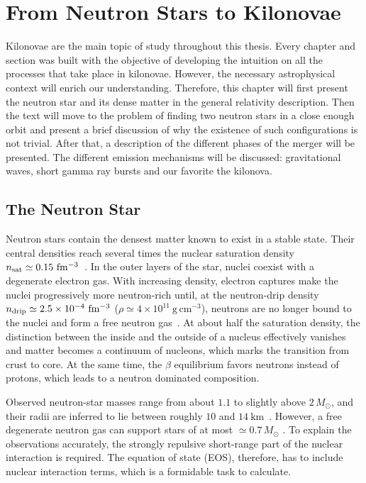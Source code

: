 \chapter{From Neutron Stars to Kilonovae}\label{chap:BNMS}

Kilonovae are the main topic of study throughout this thesis.
Every chapter and section was built with the objective of developing the intuition on all the processes that take place in kilonovae.
However, the necessary astrophysical context will enrich our understanding.
Therefore, this chapter will first present the neutron star and its dense matter in the general relativity description. 
Then the text will move to the problem of finding two neutron stars in a close enough orbit and present a brief discussion of why the existence of such configurations is not trivial.
After that, a description of the different phases of the merger will be presented.
The different emission mechanisms will be discussed: gravitational waves, short gamma ray bursts and our favorite the kilonova.

\section{The Neutron Star}\label{NS}

Neutron stars contain the densest matter known to exist in a stable state. 
Their central densities reach several times the nuclear saturation density $n_{\rm sat}\simeq 0.15~\mathrm{fm^{-3}}$~\cite{horowitz_insights_2020}. 
In the outer layers of the star, nuclei coexist with a degenerate electron gas. 
With increasing density, electron captures make the nuclei progressively more neutron-rich until, at the neutron-drip density $n_{\rm drip}\simeq 2.5\times10^{-4}~\mathrm{fm^{-3}}$ ($\rho\simeq 4\times10^{11}~\mathrm{g\,cm^{-3}}$), neutrons are no longer bound to the nuclei and form a free neutron gas~\cite{baym_neutron_1971}.
At about half the saturation density, the distinction between the inside and the outside of a nucleus effectively vanishes and matter becomes a continuum of nucleons, which marks the transition from crust to core. 
At the same time, the $\beta$ equilibrium favors neutrons instead of protons, which leads to a neutron dominated composition. 

Observed neutron-star masses range from about $1.1$ to slightly above $2\,M_\odot$, and their radii are inferred to lie between roughly $10$ and $14~\mathrm{km}$~\cite{ozel_masses_2016,riley_nicer_2021}.
However, a free degenerate neutron gas can support stars of at most $\simeq 0.7\,M_\odot$ \cite{oppenheimer_massive_1939,tolman_static_1939}.
To explain the observations accurately, the strongly repulsive short-range part of the nuclear interaction is required. 
The equation of state (EOS), therefore, has to include nuclear interaction terms, which is a formidable task to calculate.

